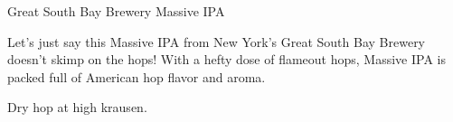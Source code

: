 \begin{recipie}{Great South Bay Brewery Massive IPA}

\begin{aboutblock}
Let's just say this Massive IPA from New York's Great South Bay Brewery doesn't
skimp on the hops! With a hefty dose of flameout hops, Massive IPA is packed full
of American hop flavor and aroma. \sourceaha
\end{aboutblock}


\begin{methodandtiming}
 
\begin{mashsteps}
\end{mashsteps}

\begin{directions}
Dry hop at high krausen.
\end{directions}

\end{methodandtiming}

\pagebreak

\begin{ingredientsblock}

\begin{malts}
\end{malts}

\begin{hops}
\end{hops}


\end{ingredientsblock}

\end{recipie}


